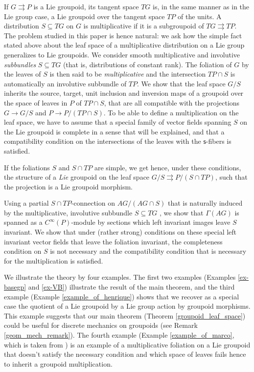 \documentclass{amsart}
\theoremstyle{definition}
\begin{document}
\medskip

If $G{{\rightrightarrows}} P$ is a Lie groupoid, its tangent space $TG$  is, in the same manner as in 
the Lie group case, a Lie groupoid over the tangent space $TP$ of the units.
 A distribution $S\subseteq TG$  on $G$ is multiplicative
if it is a subgroupoid of $TG{{\rightrightarrows}} TP$.
The problem studied in this paper is hence natural: we ask how the  simple fact
stated above about the leaf space of a
multiplicative
distribution on a Lie group generalizes to Lie groupoids.
We consider smooth multiplicative and involutive \emph{subbundles}
$S\subseteq TG$ (that is, distributions of constant rank). 
The foliation of $G$ by the leaves of $S$ is then said to be \emph{multiplicative}
and the intersection $TP\cap S$  is  automatically an involutive subbundle of $TP$.
We show that  the leaf space 
$G/S$ inherits the source, target, unit inclusion  and 
inversion maps of a groupoid over the space of leaves in $P$  of $TP
\cap S$, that are all compatible with the projections 
$G\to G/S$ and $P\to P/(TP\cap S)$.  
To be able to define a multiplication on the leaf space,
 we have to assume that a special family of vector fields spanning $S$
 on the Lie groupoid  
is complete in a sense that will be explained, and that a compatibility condition
on the intersections of the leaves with the ${{\mathsf{s}}}$-fibers is satisfied.

If the foliations $S$ and $S\cap TP$ are simple, we get hence, under these conditions,
the structure of a  \emph{Lie} groupoid
 on the leaf space $G/S{{\rightrightarrows}} P/(S\cap TP)$, such that the projection is a Lie groupoid morphism.

Using a partial $S\cap TP$-connection on 
$AG/(AG\cap S)$ that is naturally induced by the multiplicative, involutive subbundle 
$S\subseteq TG$ \cite{JoOr11}, we show that 
$\Gamma(AG)$ is spanned as a $C^\infty(P)$-module 
by sections which left invariant images leave $S$ invariant. 
We show that under (rather strong) conditions on these special left invariant vector fields
that leave the foliation invariant,  the completeness condition on $S$ is not necessary and 
the compatibility condition that is necessary for the multiplication is satisfied.

\medskip

We illustrate the theory by four examples. The first two examples 
(Examples \ref{ex-basegp} and \ref{ex-VB}) illustrate the result of the main 
theorem, and the third example
(Example \ref{example_of_henrique}) shows that we recover as a special case
 the quotient of a Lie groupoid by a Lie group action by  groupoid morphisms.
This example suggests that our main theorem (Theorem \ref{groupoid_leaf_space})
could be useful for discrete mechanics on groupoids (see Remark \ref{geom_mech_remark}).
The fourth example (Example \ref{example_of_marco}, which is taken from \cite{Zambon10})
 is an example of a multiplicative foliation on a Lie groupoid that doesn't satisfy
the necessary  condition and which space of leaves fails
hence to inherit a groupoid multiplication.
\end{document}
